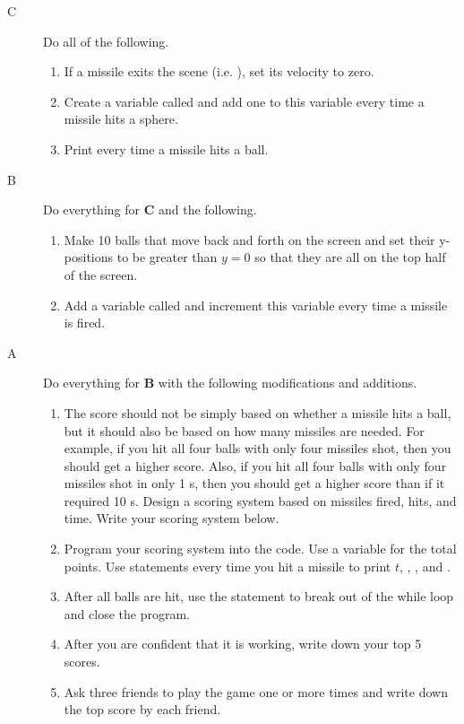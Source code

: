 \begin{description}
	\item[C] Do all of the following.
\begin{enumerate}
	\item If a missile exits the scene (i.e. ), set its velocity to zero.
	\item Create a variable called  and add one to this variable every time a missile hits a sphere.
	\item Print  every time a missile hits a ball.
\end{enumerate}

	\item[B] Do everything for {\bf C} and the following.

\begin{enumerate}
	\item Make 10 balls that move back and forth on the screen and set their y-positions to be greater than $y=0$ so that they are all on the top half of the screen.
	\item Add a variable called  and increment this variable every time a missile is fired.
\end{enumerate}

	\item[A] Do everything for {\bf B} with the following modifications and additions.

\begin{enumerate}
	\item The score should not be simply based on whether a missile hits a ball, but it should also be based on how many missiles are needed. For example, if you hit all four balls with only four missiles shot, then you should get a higher score. Also, if you hit all four balls with only four missiles shot in only 1 s, then you should get a higher score than if it required 10 s. Design a scoring system  based on missiles fired, hits, and time. Write your scoring system below.

\tightframe{\vspace{1.5in} \ }

	\item Program your scoring system into the code. Use a variable  for the total points. Use  statements every time you hit a missile to print $t$, , , and .
	
	\item After all balls are hit, use the  statement to break out of the while loop and close the program.
	
	\item After you are confident that it is working, write down your top 5 scores.

\tightframe{\vspace{0.75in} \ }
	
	\item Ask three friends to play the game one or more times and write down the top score by each friend.

\tightframe{\vspace{0.75in} \ }

\end{enumerate}

\end{description}
